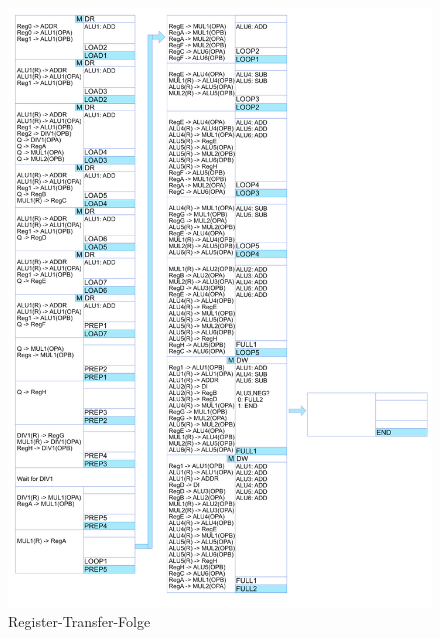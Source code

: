 \documentclass{artilcle}
\begin{document}
    \begin{figure}[!htbp]
        \includegraphics[width=\textwidth]{../Diagramme/RegisterTransferfolge/RegisterTransferFolgeKomplett.png}
        \caption{Register-Transfer-Folge}
        \label{RT-Folge}
    \end{figure}
\end{document}
